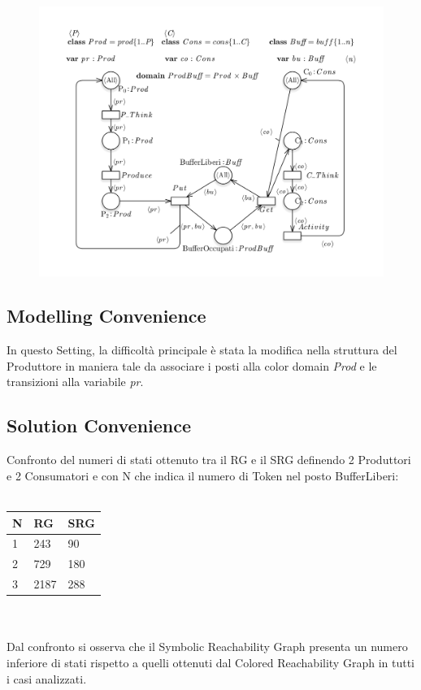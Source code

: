 \documentclass{article}
\begin{document}
\begin{figure}[h] 
\centering
\includegraphics[scale=0.4]{WN-Setting3-Marcatura.png}
\end{figure}
\clearpage
\subsection{Modelling Convenience}
In questo Setting, la difficoltà principale è stata la modifica nella struttura del Produttore in maniera tale da associare i posti alla color domain \textit{Prod} e le transizioni alla variabile \textit{pr}.
\subsection{Solution Convenience}
Confronto del numeri di stati ottenuto tra il RG e il SRG definendo 2 Produttori e 2 Consumatori e con N che indica il numero di Token nel posto BufferLiberi:
\\\\
\begin{tabular}{|p{3cm}||p{3cm}|p{3cm}|}
\hline
N & RG & SRG\\
\hline
1&243&90\\
2&729&180\\
3&2187&288\\
\hline
\end{tabular}
\\\\Dal confronto si osserva che il Symbolic Reachability Graph presenta un numero inferiore di stati rispetto a quelli ottenuti dal Colored Reachability Graph in tutti i casi analizzati. 
\end{document}
